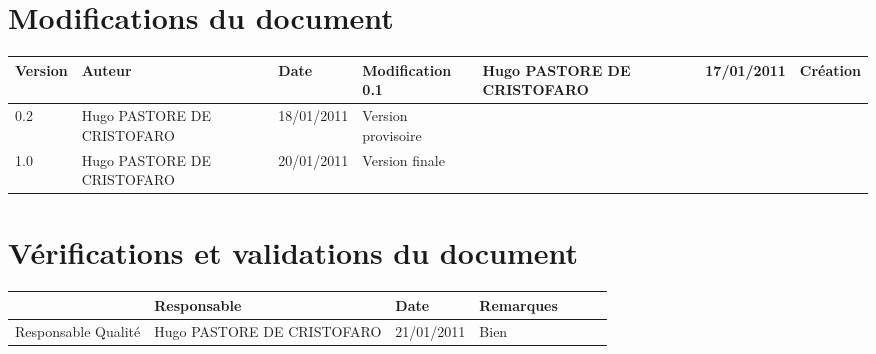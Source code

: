
\section*{Modifications du document}

\begin{center}
\begin{longtable}{|m{14mm}||m{36mm}|m{36mm}|m{60mm}|}
\hline
Version & Auteur & Date & Modification\endhead \hline
0.1
& %
Hugo PASTORE DE CRISTOFARO
& %
17/01/2011
& %
Création
\\\hline
0.2
& %
Hugo PASTORE DE CRISTOFARO
& %
18/01/2011
& %
Version provisoire
\\\hline
1.0
& %
Hugo PASTORE DE CRISTOFARO
& %
20/01/2011
& %
Version finale
\\\hline
\end{longtable}
\end{center}


\section*{Vérifications et validations du document}

\begin{center}
\begin{longtable}{|m{15mm}|m{36mm}|m{36mm}|m{60mm}|}
\hline
 & Responsable & Date & Remarques\endhead \hline

& %

& %

& %

\\\hline
Responsable Qualité
& %
Hugo PASTORE DE CRISTOFARO
& %
21/01/2011
& %
Bien
\\\hline
\end{longtable}
\end{center}

\pagebreak

